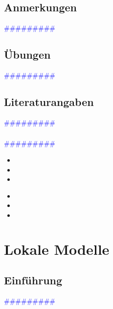 \documentclass{article}
\begin{document}
  \subsection{Anmerkungen} %
      \textcolor{blue}{\#\#\#\#\#\#\#\#\#}
  \subsection{Übungen} %
      \textcolor{blue}{\#\#\#\#\#\#\#\#\#}
  \subsection{Literaturangaben} %
      \textcolor{blue}{\#\#\#\#\#\#\#\#\#}
    \subsubsection{} %
      \textcolor{blue}{\#\#\#\#\#\#\#\#\#}

      \begin{itemize}
      \color{red}
        \item
        \item
        \item
      \end{itemize}


      \begin{itemize}
      \color{ForestGreen}
        \item
        \item
        \item
      \end{itemize}




\newpage
\section{Lokale Modelle} %
  \subsection{Einführung} %
      \textcolor{blue}{\#\#\#\#\#\#\#\#\#}
\end{document}
